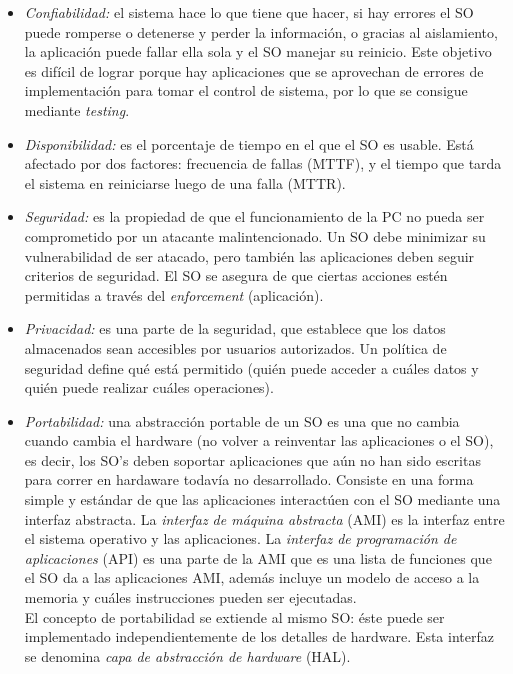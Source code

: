 \documentclass[a4paper,10pt,spanish]{article}
\begin{document}
\begin{itemize}
\item \textit{Confiabilidad:} el sistema hace lo que tiene que hacer, si hay errores el SO puede romperse o detenerse y perder la información, o gracias al aislamiento, la aplicación puede fallar ella sola y el SO manejar su reinicio. Este objetivo es difícil de lograr porque hay aplicaciones que se aprovechan de errores de implementación para tomar el control de sistema, por lo que se consigue mediante \textit{testing}.

\item \textit{Disponibilidad:} es el porcentaje de tiempo en el que el SO es usable. Está afectado por dos factores: frecuencia de fallas (MTTF), y el tiempo que tarda el sistema en reiniciarse luego de una falla (MTTR).

\item \textit{Seguridad:} es la propiedad de que el funcionamiento de la PC no pueda ser comprometido por un atacante malintencionado. Un SO debe minimizar su vulnerabilidad de ser atacado, pero también las aplicaciones deben seguir criterios de seguridad. El SO se asegura de que ciertas acciones estén permitidas a través del \textit{enforcement} (aplicación).

\item \textit{Privacidad:} es una parte de la seguridad, que establece que los datos almacenados sean accesibles por usuarios autorizados. Un política de seguridad define qué está permitido (quién puede acceder a cuáles datos y quién puede realizar cuáles operaciones).

\item \textit{Portabilidad:} una abstracción portable de un SO es una que no cambia cuando cambia el hardware (no volver a reinventar las aplicaciones o el SO), es decir, los SO's deben soportar aplicaciones que aún no han sido escritas para correr en hardaware todavía no desarrollado. Consiste en una forma simple y estándar de que las aplicaciones interactúen con el SO mediante una interfaz abstracta. La \textit{interfaz de máquina abstracta} (AMI) es la interfaz entre el sistema operativo y las aplicaciones. La \textit{interfaz de programación de aplicaciones} (API) es una parte de la AMI que es una lista de funciones que el SO da a las aplicaciones AMI, además incluye un modelo de acceso a la memoria y cuáles instrucciones pueden ser ejecutadas.\\
El concepto de portabilidad se extiende al mismo SO: éste puede ser implementado independientemente de los detalles de hardware. Esta interfaz se denomina \textit{capa de abstracción de hardware} (HAL).


\end{itemize}
\end{document}
